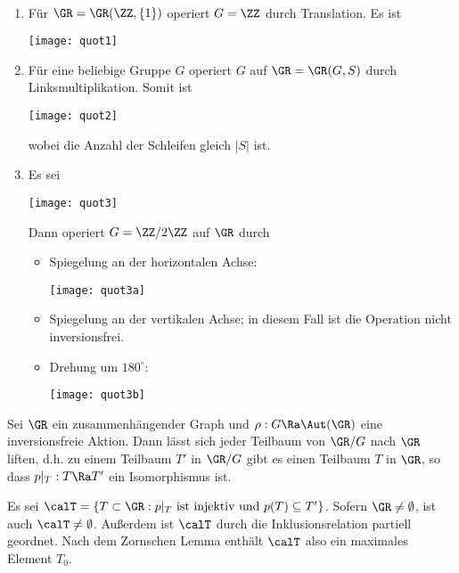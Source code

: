 \BSP\
\begin{enumerate}
\item Für $\GR=\GR(\ZZ,\{1\})$ operiert $G=\ZZ$ durch
Translation. Es ist
\begin{center}
	\texttt{[image: quot1]}
\end{center}
\item Für eine beliebige Gruppe $G$ operiert $G$ auf
$\GR=\GR(G,S)$ durch Linksmultiplikation.
Somit ist
\begin{center}
	\texttt{[image: quot2]}
\end{center}
wobei die Anzahl der Schleifen gleich $|S|$ ist.
\item Es sei
\begin{center}
	\texttt{[image: quot3]}
\end{center}
Dann operiert $G=\ZZ/2\ZZ$ auf $\GR$ durch
\begin{itemize}
\item Spiegelung an der horizontalen Achse:
\begin{center}
	\texttt{[image: quot3a]}
\end{center}
\item Spiegelung an der vertikalen Achse; in diesem Fall ist
die Operation nicht inversionsfrei.
\item
Drehung um $180^\circ$:
\begin{center}
	\texttt{[image: quot3b]}
\end{center}
\end{itemize}
\end{enumerate}

\BEM\label{bem_lift}
Sei $\GR$ ein zusammenhängender Graph und $\rho:G\Ra\Aut(\GR)$
eine inversionsfreie Aktion.
Dann lässt sich jeder Teilbaum von $\GR/G$ nach $\GR$ liften,
d.h. zu einem Teilbaum $T'$ in $\GR/G$ gibt es einen Teilbaum $T$ in
$\GR$, so dass $p|_T:T\Ra T'$ ein Isomorphismus ist.

\bew Es sei
$\calT =\{ T \subset \GR : p|_T \text{ ist injektiv und } p(T)\subseteq T' \}$.
Sofern $\GR\neq\emptyset$, ist auch $\calT\neq\emptyset$.
Außerdem ist $\calT$ durch die Inklusionsrelation partiell geordnet.
Nach dem Zornschen Lemma enthält $\calT$ also ein maximales Element
$T_0$.

